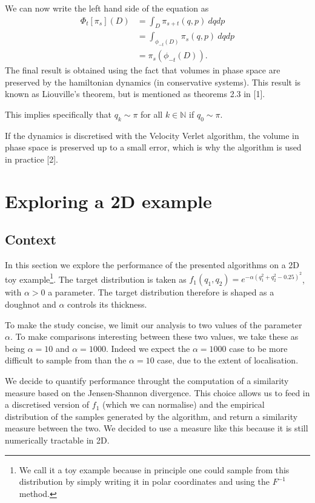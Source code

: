 \documentclass[a4paper, 12pt,oneside]{article}
\begin{document}
			We can now write the left hand side of the equation as
			\begin{align}
				\Phi_t[\pi_s](D)&=\int_D \pi_{s+t}(q,p)\ dqdp \\
					&=\int_{\phi_{-t}(D)}\pi_{s}(q,p)\ dqdp \\
					&=\pi_s(\phi_{-t}(D)).
			\end{align}
			The final result is obtained using the fact that volumes in phase space are preserved by the hamiltonian dynamics (in conservative systems). This result is known as Liouville's theorem, but is mentioned as theorems 2.3 in [1].
	
			This implies specifically that $q_k\sim\pi$ for all $k\in\mathbb{N}$ if $q_0\sim \pi$. 
	
			If the dynamics is discretised with the Velocity Verlet algorithm, the volume in phase space is preserved up to a small error, which is why the algorithm is used in practice [2].
	\section{Exploring a 2D example}
		\subsection{Context}
		In this section we explore the performance of the presented algorithms on a 2D toy example\footnote{We call it a toy example because in principle one could sample from this distribution by simply writing it in polar coordinates and using the $F^{-1}$ method.}. The target distribution is taken as $f_1(q_1,q_2)=e^{-\alpha(q_1^2+q_2^2-0.25)^2}$, with $\alpha>0$ a parameter. The target distribution therefore is shaped as a doughnot and $\alpha$ controls its thickness. 
		
		To make the study concise, we limit our analysis to two values of the parameter $\alpha$. To make comparisons interesting between these two values, we take these as being $\alpha =10$ and $\alpha=1000$. Indeed we expect the $\alpha=1000$ case to be more difficult to sample from than the $\alpha=10$ case, due to the extent of localisation.

		We decide to quantify performance throught the computation of a similarity measure based on the Jensen-Shannon divergence. This choice allows us to feed in a discretised version of $f_1$ (which we can normalise) and the empirical distribution of the samples generated by the algorithm, and return a similarity measure between the two. We decided to use a measure like this because it is still numerically tractable in 2D.  
\end{document}
